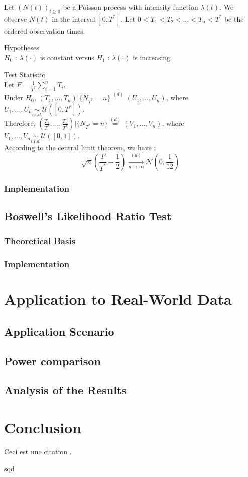 \documentclass{journalstyle}
\begin{document}
Let $(N(t))_{t \geq 0}$ be a Poisson process with intensity function $\lambda(t)$.
We observe $N(t)$ in the interval $[0, T^*]$.
Let $0 < T_1 < T_2 < \ldots < T_n < T^*$ be the ordered observation times.

\noindent\underline{Hypotheses} \\
$H_0$ : $\lambda(\cdot)$ is constant versus
$H_1$ : $\lambda(\cdot)$ is increasing.

\noindent\underline{Test Statistic} \\
Let $F = \frac{1}{T^*} \sum_{i=1}^n T_i$. \\
Under $H_0$, $(T_1, \ldots, T_n) | \{N_{T^*} = n\} \overset{(d)}{=} (U_1, \ldots, U_n)$, where $U_1, \ldots, U_n \underset{i.i.d.}{\sim} \mathcal{U}([0, T^*])$. \\
Therefore, $(\frac{T_1}{T^*}, \ldots, \frac{T_n}{T^*}) | \{N_{T^*} = n\} \overset{(d)}{=} (V_1, \ldots, V_n)$, where $V_1, \ldots, V_n \underset{i.i.d.}{\sim} \mathcal{U}([0, 1])$. \\
According to the central limit theorem, we have :
\[
\sqrt{n} \left( \frac{F}{T^*} - \frac{1}{2} \right) \xrightarrow[n \to \infty]{(d)} \mathcal{N}(0, \frac{1}{12})
\]



\subsubsection{Implementation}


\subsection{Boswell's Likelihood Ratio Test}

\subsubsection{Theoretical Basis}

\subsubsection{Implementation}


\section{Application to Real-World Data}

\subsection{Application Scenario}

\subsection{Power comparison}

\subsection{Analysis of the Results}




\section{Conclusion}
Ceci est une citation \cite{smith2020example}.

\newpage sqd


\printbibliography
\end{document}
